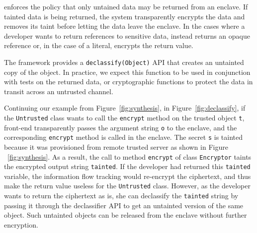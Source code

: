 
\sysname{} enforces the policy that only untained data may be returned from an enclave.
If tainted data is being returned, the system transparently encrypts the data and removes its taint before letting the data leave the enclave.
In the cases where a developer wants to return references to sensitive data, \sysname{} instead returns an opaque reference or, in the case of a literal, encrypts the return value.



The \sysname{} framework provides a {\tt declassify(Object)} API that creates an untainted
copy of the object.  In practice, we expect this function to be used in conjunction with tests
on the returned data, or cryptographic functions to protect the data in transit across an untrusted channel.

Continuing our example from Figure~\ref{fig:synthesis}, in Figure~\ref{fig:declassify}, if the {\tt Untrusted} class wants to call the {\tt encrypt} method on the trusted object {\tt t}, \sysname{} front-end transparently passes the argument string {\tt o} to the enclave, and the corresponding {\tt encrypt} method is called in the enclave. The secret {\tt s} is tainted because it was provisioned from remote trusted server as shown in Figure ~\ref{fig:synthesis}. As a result, the call to method {\tt encrypt} of class {\tt Encryptor} taints the encrypted output string {\tt tainted}. If the developer had returned this {\tt tainted} variable, the \sysname{} information flow tracking would re-encrypt the ciphertext, and thus make the return value useless for the {\tt Untrusted} class. However, as the developer wants to return the ciphertext as is, she can declassify the {\tt tainted} string by passing it through the declassifier API to get an untainted version of the same object. Such untainted objects can be released from the enclave without further encryption.

